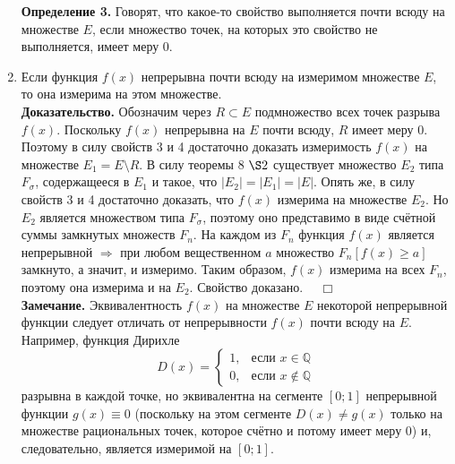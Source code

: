 \documentclass[12pt,a4paper, titlepage]{article}
\begin{document}
\begin{enumerate}
\textbf{Определение 3.} Говорят, что какое-то свойство выполняется почти всюду на множестве $E$, если множество точек, на которых это свойство не выполняется, имеет меру 0.

\item Если функция $f(x)$ непрерывна почти всюду на измеримом множестве $E$, то она измерима на этом множестве.\\
\textbf{Доказательство.} Обозначим через $R \subset E$ подмножество всех точек разрыва $f(x)$. Поскольку $f(x)$ непрерывна на $E$ почти всюду, $R$ имеет меру 0. Поэтому в силу свойств 3 и 4 достаточно доказать измеримость $f(x)$ на множестве $E_1 = E \setminus R$. В силу теоремы 8 $\S 2$ существует множество $E_2$ типа $F_\sigma$, содержащееся в $E_1$ и такое, что $|E_2| = |E_1| = |E|$. Опять же, в силу свойств 3 и 4 достаточно доказать, что $f(x)$ измерима на множестве $E_2$. Но $E_2$ является множеством типа $F_\sigma$, поэтому оно представимо в виде счётной суммы замкнутых множеств $F_n$. На каждом из $F_n$ функция $f(x)$ является непрерывной $\Rightarrow$ при любом вещественном $a$ множество $F_n[f(x) \geqslant a]$ замкнуто, а значит, и измеримо. Таким образом, $f(x)$ измерима на всех $F_n$, поэтому она измерима и на $E_2$. Свойство доказано. $\quad \Box$\\

\textbf{Замечание.} Эквивалентность $f(x)$ на множестве $E$ некоторой непрерывной функции следует отличать от непрерывности $f(x)$ почти всюду на $E$. Например, функция Дирихле
$$
D(x)=\begin{cases}
1,&\text{если $x \in \mathbb{Q}$}\\
0,&\text{если $x \notin \mathbb{Q}$}
\end{cases}
$$
разрывна в каждой точке, но эквивалентна на сегменте $[0; 1]$ непрерывной функции $g(x) \equiv 0$ (поскольку на этом сегменте $D(x) \neq g(x)$ только на множестве рациональных точек, которое счётно и потому имеет меру 0) и, следовательно, является измеримой на $[0; 1]$.
\end{enumerate}
\end{document}
